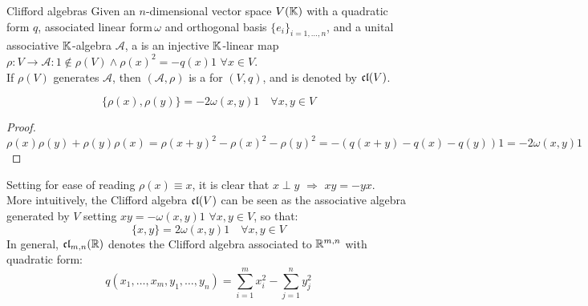 \begin{definition}{Clifford algebras}{}
  Given an $ n $-dimensional vector space $ V(\mathbb{K}) $ with a quadratic form $ q $, associated linear form\footnotemark $ \, \omega $ and orthogonal basis $ \{e_i\}_{i = 1,\dots,n} $, and a unital associative $ \mathbb{K} $-algebra $ \mathcal{A} $, a  is an injective $ \mathbb{K} $-linear map $ \rho : V \rightarrow \mathcal{A} : \mathit{1} \notin \rho(V) \land \rho(x)^2 = - q(x) \mathit{1} \,\,\forall x \in V $.\\
  If $ \rho(V) $ generates $ \mathcal{A} $, then $ (\mathcal{A},\rho) $ is a  for $ (V,q) $, and is denoted by $ \mathfrak{cl}(V) $.
\end{definition}
%
%
\begin{lemma}[before upper = {\tcbtitle}]{}{}
  \begin{equation*}
    \{\rho(x) , \rho(y)\} = - 2 \omega(x,y) \mathit{1} \quad \forall x,y \in V
  \end{equation*}
\end{lemma}

\begin{proofbox}
  \begin{proof}
    \begin{equation*}
      \rho(x) \rho(y) + \rho(y) \rho(x) = \rho(x + y)^2 - \rho(x)^2 - \rho(y)^2 = - \left( q(x + y) - q(x) - q(y) \right) \mathit{1} = - 2 \omega(x,y) \mathit{1}
    \end{equation*}
  \end{proof}
\end{proofbox}

Setting for ease of reading $ \rho(x) \equiv x $, it is clear that $ x \perp y \,\,\Rightarrow\,\, xy = -yx $.\\
More intuitively, the Clifford algebra $ \mathfrak{cl}(V) $ can be seen as the associative algebra generated by $ V $ setting $ xy = - \omega(x,y)\mathit{1} \,\,\forall x,y \in V$, so that:
\begin{equation}
  \{x,y\} = 2 \omega(x,y)\mathit{1} \quad \forall x,y \in V
  \label{eq:cliff-alg}
\end{equation}
In general, $ \mathfrak{cl}_{m,n}(\mathbb{R}) $ denotes the Clifford algebra associated to $ \mathbb{R}^{m,n} $ with quadratic form:
\begin{equation*}
  q(x_1,\dots,x_m,y_1,\dots,y_n) = \sum_{i = 1}^{m} x_i^2 - \sum_{j = 1}^{n} y_j^2
\end{equation*}

